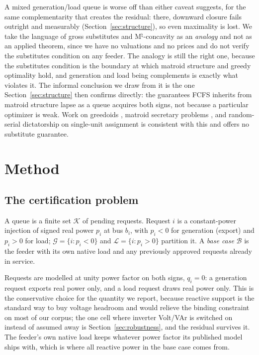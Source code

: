 \documentclass[review,authoryear,12pt]{elsarticle}
\begin{document}
A mixed generation/load queue is worse off than either caveat suggests, for
the same complementarity that creates the residual: there, downward closure
fails outright and measurably (Section~\ref{sec:structure}), so even
maximality is lost. We take the language of gross substitutes
\citep{kelso1982} and M$^\natural$-concavity \citep{murota2003} as an
\emph{analogy} and not as an applied theorem, since we have no valuations and
no prices and do not verify the substitutes condition on any feeder. The
analogy is still the right one, because the substitutes condition is the
boundary at which matroid structure and greedy optimality hold, and generation
and load being complements is exactly what violates it. The informal
conclusion we draw from it is the one Section~\ref{sec:structure} then
confirms directly: the guarantees FCFS inherits from matroid structure lapse
as a queue acquires both signs, not because a particular optimizer is weak.
Work on greedoids \citep{korte1991}, matroid secretary problems
\citep{babaioff2007,feldman2016}, and random-serial dictatorship on
single-unit assignment \citep{abdulkadiroglu1998,bogomolnaia2001} is
consistent with this and offers no substitute guarantee.

\section{Method}
\label{sec:method}

\subsection{The certification problem}
\label{sec:problem}

A queue is a finite set $\mathcal{K}$ of pending requests. Request $i$ is a
constant-power injection of signed real power $p_i$ at bus $b_i$, with
$p_i < 0$ for generation (export) and $p_i > 0$ for load; $\mathcal{G} = \{i :
p_i < 0\}$ and $\mathcal{L} = \{i : p_i > 0\}$ partition it. A \emph{base case}
$\mathcal{B}$ is the feeder with its own native load and any previously
approved requests already in service.

Requests are modelled at unity power factor on both signs, $q_i = 0$: a
generation request exports real power only, and a load request draws real power
only. This is the conservative choice for the quantity we report, because
reactive support is the standard way to buy voltage headroom and would relieve
the binding constraint on most of our corpus; the one cell where inverter
Volt/VAr is switched on instead of assumed away is
Section~\ref{sec:robustness}, and the residual survives it. The feeder's own
native load keeps whatever power factor its published model ships with, which
is where all reactive power in the base case comes from.
\end{document}
